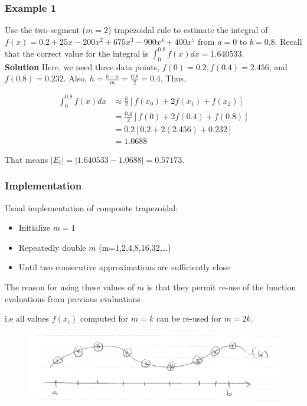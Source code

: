 \documentclass [titlepage,12pt,letter] {article}
\begin{document}
\subsubsection{Example 1} Use the two-segment ($m=2$) trapezoidal rule to estimate the integral of $f(x)=0.2+25x-200x^2+675x^3-900x^4+400x^5$ from $a=0$ to $b=0.8$. Recall that the correct value for the integral is $\int_0^{0.8} f(x)dx=1.640533$. \\

\noindent
{\bf Solution} Here, we need three data points, $f(0)=0.2, f(0.4)=2.456$, and $f(0.8)=0.232$. Also, $h=\frac{b-a}{m}=\frac{0.8}{2}=0.4$. Thus,

\begin{align*}
\int_0^{0.8} f(x)dx &\approx \frac{h}{2} \left[f(x_0)+2f(x_1)+f(x_2) \right] \\
&= \frac{0.4}{2}\left[f(0)+2f(0.4)+f(0.8) \right] \\
&= 0.2\left[0.2+2(2.456)+0.232 \right] \\
&=1.0688
\end{align*}

\noindent
That means $|E_t| = |1.640533 - 1.0688| = 0.57173$.

\subsubsection{Implementation} Usual implementation of composite trapezoidal: 
\begin{itemize} 
\item Initialize $m=1$ 
\item Repeatedly double $m$ (m=1,2,4,8,16,32,\dots )
\item Until two consecutive approximations are sufficiently close 
\end{itemize} 


The reason for using these values of $m$ is that they permit re-use of the function evaluations from previous evaluations

 i.e all values $f(x_i)$ computed for $m=k$ can be re-used for $m=2k$. 


\begin{figure}[h] 
  \centering
  \includegraphics[scale=0.4]{reuse_of_points}
  \label{fig:reuse}
\end{figure}
 
\end{document}

